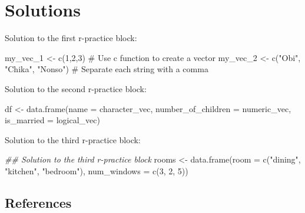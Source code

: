 \documentclass[
  letterpaper,
  DIV=11,
  numbers=noendperiod]{scrreprt}
\newenvironment{Shaded}{\begin{snugshade}}{\end{snugshade}}
\newcommand{\AttributeTok}[1]{\textcolor[rgb]{0.40,0.45,0.13}{#1}}
\newcommand{\CommentTok}[1]{\textcolor[rgb]{0.37,0.37,0.37}{#1}}
\newcommand{\DecValTok}[1]{\textcolor[rgb]{0.68,0.00,0.00}{#1}}
\newcommand{\DocumentationTok}[1]{\textcolor[rgb]{0.37,0.37,0.37}{\textit{#1}}}
\newcommand{\FunctionTok}[1]{\textcolor[rgb]{0.28,0.35,0.67}{#1}}
\newcommand{\NormalTok}[1]{\textcolor[rgb]{0.00,0.23,0.31}{#1}}
\newcommand{\OtherTok}[1]{\textcolor[rgb]{0.00,0.23,0.31}{#1}}
\newcommand{\StringTok}[1]{\textcolor[rgb]{0.13,0.47,0.30}{#1}}
\begin{document}
\hypertarget{solutions}{%
\section{Solutions}\label{solutions}}

Solution to the first r-practice block:

\begin{Shaded}
\begin{Highlighting}[]
\NormalTok{my\_vec\_1 }\OtherTok{\textless{}{-}} \FunctionTok{c}\NormalTok{(}\DecValTok{1}\NormalTok{,}\DecValTok{2}\NormalTok{,}\DecValTok{3}\NormalTok{) }\CommentTok{\# Use \textquotesingle{}c\textquotesingle{} function to create a vector}
\NormalTok{my\_vec\_2 }\OtherTok{\textless{}{-}} \FunctionTok{c}\NormalTok{(}\StringTok{"Obi"}\NormalTok{, }\StringTok{"Chika"}\NormalTok{, }\StringTok{"Nonso"}\NormalTok{) }\CommentTok{\# Separate each string with a comma}
\end{Highlighting}
\end{Shaded}

Solution to the second r-practice block:

\begin{Shaded}
\begin{Highlighting}[]
\NormalTok{df }\OtherTok{\textless{}{-}} \FunctionTok{data.frame}\NormalTok{(}\AttributeTok{name =}\NormalTok{ character\_vec, }
                 \AttributeTok{number\_of\_children =}\NormalTok{ numeric\_vec, }
                 \AttributeTok{is\_married =}\NormalTok{ logical\_vec)}
\end{Highlighting}
\end{Shaded}

Solution to the third r-practice block:

\begin{Shaded}
\begin{Highlighting}[]
\DocumentationTok{\#\# Solution to the third r{-}practice block}
\NormalTok{rooms }\OtherTok{\textless{}{-}} \FunctionTok{data.frame}\NormalTok{(}\AttributeTok{room =} \FunctionTok{c}\NormalTok{(}\StringTok{"dining"}\NormalTok{, }\StringTok{"kitchen"}\NormalTok{, }\StringTok{"bedroom"}\NormalTok{), }
                    \AttributeTok{num\_windows =} \FunctionTok{c}\NormalTok{(}\DecValTok{3}\NormalTok{, }\DecValTok{2}\NormalTok{, }\DecValTok{5}\NormalTok{))}
\end{Highlighting}
\end{Shaded}

\hypertarget{references-6}{%
\subsection*{References}\label{references-6}}
\end{document}
